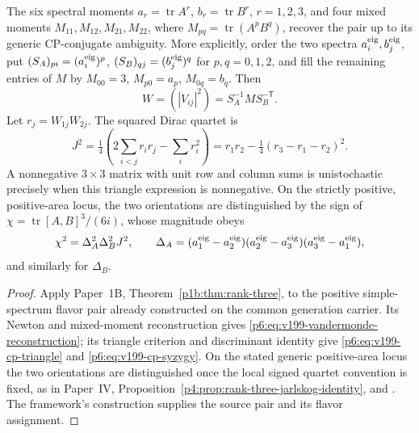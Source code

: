 \documentclass[12pt,a4paper]{article}
\begin{document}
\begin{theorem}
\label{p6:thm:v199-flavor-reconstruction}
The six spectral moments \(a_r=\operatorname{tr}A^r\),
\(b_r=\operatorname{tr}B^r\), \(r=1,2,3\), and four mixed moments
\(M_{11},M_{12},M_{21},M_{22}\), where
\(M_{pq}=\operatorname{tr}(A^pB^q)\), recover the pair up to its generic
CP-conjugate ambiguity.  More explicitly, order the two spectra
\(a_i^{\rm eig},b_j^{\rm eig}\), put
\((S_A)_{pi}=(a_i^{\rm eig})^p\),
\((S_B)_{qj}=(b_j^{\rm eig})^q\) for \(p,q=0,1,2\), and fill the
remaining entries of \(M\) by \(M_{00}=3\), \(M_{p0}=a_p\),
\(M_{0q}=b_q\).  Then
\begin{equation}
 W=(|V_{ij}|^2)=S_A^{-1}MS_B^{-\mathsf T}.
 \label{p6:eq:v199-vandermonde-reconstruction}
\end{equation}
Let \(r_j=W_{1j}W_{2j}\).  The squared Dirac quartet is
\begin{equation}
 J^2=\tfrac14\left(2\sum_{i<j}r_ir_j-\sum_i r_i^2\right)
     =r_1r_2-\tfrac14(r_3-r_1-r_2)^2.
 \label{p6:eq:v199-cp-triangle}
\end{equation}
A nonnegative \(3\times3\) matrix with unit row and column sums is
unistochastic precisely when this triangle expression is nonnegative.
On the strictly positive, positive-area locus, the two orientations are
distinguished by the sign of
\(\chi=\operatorname{tr}[A,B]^3/(6i)\), whose magnitude obeys
\begin{equation}
 \chi^2=\Delta_A^2\Delta_B^2J^2,
 \qquad \Delta_A=(a_1^{\rm eig}-a_2^{\rm eig})
 (a_2^{\rm eig}-a_3^{\rm eig})(a_3^{\rm eig}-a_1^{\rm eig}),
 \label{p6:eq:v199-cp-syzygy}
\end{equation}
and similarly for \(\Delta_B\).
\end{theorem}
\begin{proof}
Apply Paper~1B, Theorem~\ref{p1b:thm:rank-three}, to the positive
simple-spectrum flavor pair already constructed on the common generation
carrier. Its Newton and mixed-moment reconstruction gives
\eqref{p6:eq:v199-vandermonde-reconstruction}; its triangle criterion
and discriminant identity give \eqref{p6:eq:v199-cp-triangle} and
\eqref{p6:eq:v199-cp-syzygy}. On the stated generic positive-area locus
the two orientations are distinguished once the local signed quartet
convention is fixed, as in Paper~IV,
Proposition~\ref{p4:prop:rank-three-jarlskog-identity}, and
\cite{Jarlskog1985}. The framework's construction supplies the source
pair and its flavor assignment.
\end{proof}
\end{document}
